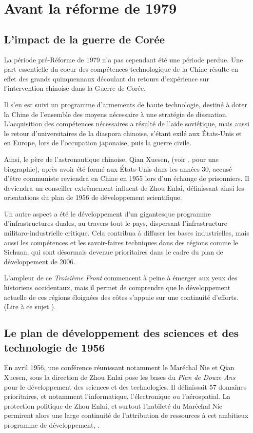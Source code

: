 \documentclass[a4paper]{article}
\begin{document}
\section{Avant la réforme de 1979}
\label{sec:org112d285}
\subsection{L’impact de la guerre de Corée}
\label{sec:org77dd9e3}
La période pré-Réforme de 1979 n’a pas cependant été une période perdue. Une
part essentielle du coeur des compétences technologique de la Chine résulte en
effet des grands quinquennaux découlant du retours d’expérience sur
l’intervention chinoise dans la Guerre de Corée.

Il s’en est suivi un programme d’armements de haute technologie, destiné à doter
la Chine de l’ensemble des moyens nécessaire à une stratégie de dissuation.
L’acquisition des compétences nécessaires a résulté de l’aide soviétique, mais
aussi le retour d’universitaires de la diaspora chinoise, s’étant exilé aux
États-Unis et en Europe, lors de l’occupation japonaise, puis la guerre civile.

 Ainsi, le père de l’astronautique chinoise, Qian Xuesen, (voir
\cite{chang95_thread}, pour une biographie), après avoir été formé aux États-Unis
dans les années 30, accusé d’être communiste reviendra en Chine en 1955 lors
d’un échange de prisonniers. Il deviendra un conseiller extrêmement influent de
Zhou Enlai, définissant ainsi les orientations du plan de 1956 de développement
scientifique.

Un autre aspect a été le développement d’un gigantesque programme
d’infra\-structures duales, au travers tout le pays, dispersant l’infrastructure
militaro-industrielle critique. Cela contribua à diffuser les bases
industrielles, mais aussi les compétences et les savoir-faires techniques dans
des régions comme le Sichuan, qui sont désormais devenue prioritaires dans le
cadre du plan de développement de 2006.

L’ampleur de ce \emph{Troisième Front} commencent à peine à émerger aux yeux des
historiens occidentaux, mais il permet de comprendre que le développement
actuelle de ces régions éloignées des côtes s’appuie sur une continuité
d’efforts. (Lire à ce sujet \cite{meyskens20_maos}).\\


\subsection{Le plan de développement des sciences et des technologie de 1956}
\label{sec:org13d69c0}
En avril 1956, une conférence réunissant notamment le Maréchal Nie et Qian
Xuesen, sous la direction de Zhou Enlai pose les bases du \emph{Plan de Douze Ans}
pour le développement des sciences et des technologies. Il définissait 57
domaines prioritaires, et notamment l’informatique, l’électronique ou
l’aérospatial. La protection politique de Zhou Enlai, et surtout l’habileté du
Maréchal Nie permirent alors une large continuité de l’attribution de ressources
à cet ambitieux programme de développement, \cite{feigenbaum03_chinas}. 
\end{document}
